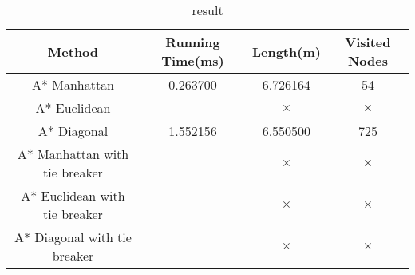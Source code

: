 \documentclass[conference]{IEEEtran}
\begin{document}
\begin{table*}[htbp]
	\caption{result}
	\centering 
	\begin{tabular}{cccc} %
		\toprule
		 Method & Running Time(ms) & Length(m) & Visited Nodes \\
		\midrule
		A* Manhattan &  0.263700 & 6.726164  & 54  \\
		A* Euclidean & \checkmark & $\times$  & $\times$  \\
		A* Diagonal & 1.552156 & 6.550500  & 725   \\
		A* Manhattan with tie breaker & \checkmark & $\times$  & $\times$ \\
		A* Euclidean with tie breaker & \checkmark & $\times$  & $\times$ \\
		A* Diagonal with tie breaker & \checkmark & $\times$  & $\times$ \\
		\bottomrule
	\end{tabular}
	\label{tbl:table1}
\end{table*}
\end{document}

